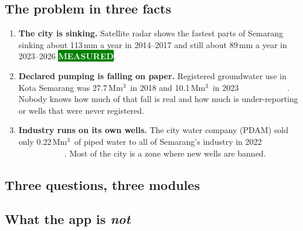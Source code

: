 \documentclass[11pt,a4paper]{article}
\newcommand{\pv}[2]{{\setlength{\fboxsep}{1.3pt}\colorbox{#1}{\textcolor{white}{\sffamily\bfseries\fontsize{6.3}{7}\selectfont #2}}}}
\newcommand{\Off}{\pv{accent}{OFFICIAL}}
\newcommand{\Mea}{\pv{green}{MEASURED}}
\newcommand{\Mm}{\,Mm$^{3}$}
\begin{document}
\subsection{The problem in three facts}

\begin{enumerate}
\item \textbf{The city is sinking.} Satellite radar shows the fastest parts of Semarang sinking about
  113\,mm a year in 2014--2017 and still about 89\,mm a year in 2023--2026 \Mea.
\item \textbf{Declared pumping is falling on paper.} Registered groundwater use in Kota Semarang was
  27.7\Mm\ in 2018 and 10.1\Mm\ in 2023 \Off. Nobody knows how much of that fall is real and how much is
  under-reporting or wells that were never registered.
\item \textbf{Industry runs on its own wells.} The city water company (PDAM) sold only 0.22\Mm\ of piped
  water to all of Semarang's industry in 2022 \Off. Most of the city is a zone where new wells are banned.
\end{enumerate}

\subsection{Three questions, three modules}

\begin{center}
\end{center}

\subsection{What the app is \emph{not}}
\end{document}
